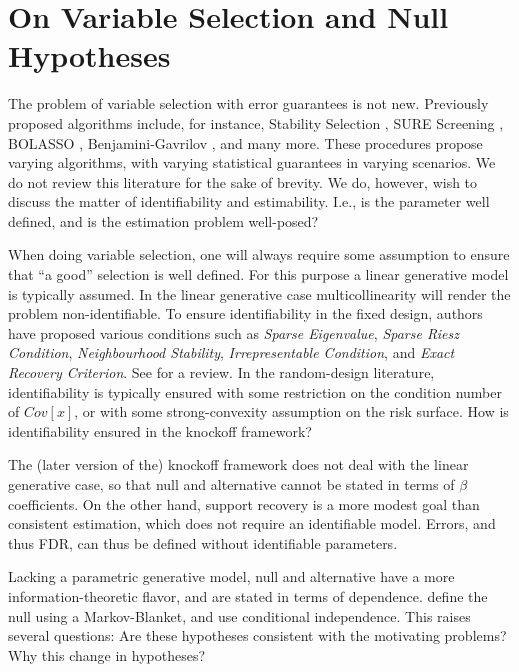 \documentclass[article,lineno]{biometrika}
\begin{document}
\section{On Variable Selection and Null Hypotheses}
The problem of variable selection with error guarantees is not new. 
Previously proposed algorithms include, for instance, Stability Selection \citep{MeinshausenStabilityselection2010}, SURE Screening \citep{fan2008sure}, BOLASSO \citep{bach2008bolasso}, Benjamini-Gavrilov \citep{Benjaminisimpleforwardselection2009}, and many more. 
These procedures propose varying algorithms, with varying statistical guarantees in varying scenarios. 
We do not review this literature for the sake of brevity. 
We do, however, wish to discuss the matter of identifiability and estimability. 
I.e., is the parameter well defined, and is the estimation problem well-posed? 

When doing variable selection, one will always require some assumption to ensure that ``a good'' selection is well defined. 
For this purpose a linear generative model is typically assumed. 
In the linear generative case multicollinearity will render the problem non-identifiable. 
To ensure identifiability in the fixed design, authors have proposed various conditions such as \emph{Sparse Eigenvalue}, \emph{Sparse Riesz Condition}, \emph{Neighbourhood Stability}, \emph{Irrepresentable Condition}, and \emph{Exact Recovery Criterion}. 
See \citet[Sec 3.1.1]{MeinshausenStabilityselection2010} for a review. 
In the random-design literature, identifiability is typically ensured with some restriction on the condition number of $Cov[x]$, or with some strong-convexity assumption on the risk surface. 
How is identifiability ensured in the knockoff framework? 

The (later version of the) knockoff framework does not deal with the linear generative case, so that null and alternative cannot be stated in terms of $\beta$ coefficients. 
On the other hand, support recovery is a more modest goal than consistent estimation, which does not require an identifiable model. 
Errors, and thus FDR, can thus be defined without identifiable parameters. 

Lacking a parametric generative model, null and alternative have a more information-theoretic flavor, and are stated in terms of dependence. 
\citet{CandesPanninggoldmodelX2018} define the null using a Markov-Blanket, and \cite{SesiaGenehuntinghidden} use conditional independence. 
This raises several questions:
Are these hypotheses consistent with the motivating problems?
Why this change in hypotheses?
\end{document}
